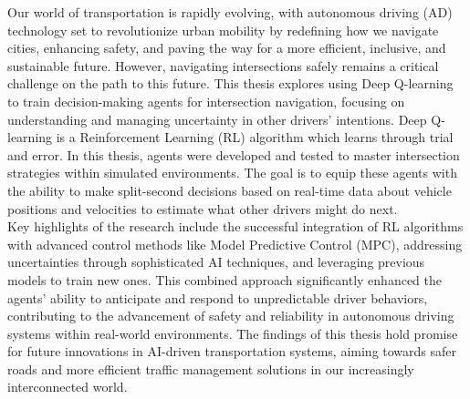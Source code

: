 Our world of transportation is rapidly evolving, with autonomous driving (AD) technology set to revolutionize urban mobility by redefining how we navigate cities, enhancing safety, and paving the way for a more efficient, inclusive, and sustainable future. However, navigating intersections safely remains a critical challenge on the path to this future. This thesis explores using Deep Q-learning to train decision-making agents for intersection navigation, focusing on understanding and managing uncertainty in other drivers' intentions.
Deep Q-learning is a Reinforcement Learning (RL) algorithm which learns through trial and error. In this thesis, agents were developed and tested to master intersection strategies within simulated environments. The goal is to equip these agents with the ability to make split-second decisions based on real-time data about vehicle positions and velocities to estimate what other drivers might do next.
\\

Key highlights of the research include the successful integration of RL algorithms with advanced control methods like Model Predictive Control (MPC), addressing uncertainties through sophisticated AI techniques, and leveraging previous models to train new ones. This combined approach significantly enhanced the agents' ability to anticipate and respond to unpredictable driver behaviors, contributing to the advancement of safety and reliability in autonomous driving systems within real-world environments. The findings of this thesis hold promise for future innovations in AI-driven transportation systems, aiming towards safer roads and more efficient traffic management solutions in our increasingly interconnected world.


